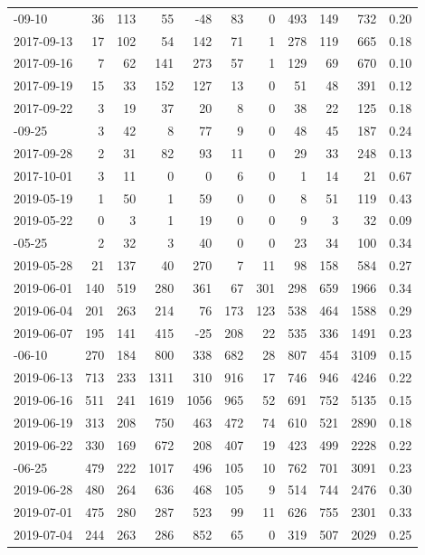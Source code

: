 \documentclass[
]{article}
\begin{document}
\begin{longtable}{lrrrrrrrrrr}
\addlinespace
2017-09-10 & 36 & 113 & 55 & -48 & 83 & 0 & 493 & 149 & 732 & 0.20\\
2017-09-13 & 17 & 102 & 54 & 142 & 71 & 1 & 278 & 119 & 665 & 0.18\\
2017-09-16 & 7 & 62 & 141 & 273 & 57 & 1 & 129 & 69 & 670 & 0.10\\
2017-09-19 & 15 & 33 & 152 & 127 & 13 & 0 & 51 & 48 & 391 & 0.12\\
2017-09-22 & 3 & 19 & 37 & 20 & 8 & 0 & 38 & 22 & 125 & 0.18\\
\addlinespace
2017-09-25 & 3 & 42 & 8 & 77 & 9 & 0 & 48 & 45 & 187 & 0.24\\
2017-09-28 & 2 & 31 & 82 & 93 & 11 & 0 & 29 & 33 & 248 & 0.13\\
2017-10-01 & 3 & 11 & 0 & 0 & 6 & 0 & 1 & 14 & 21 & 0.67\\
2019-05-19 & 1 & 50 & 1 & 59 & 0 & 0 & 8 & 51 & 119 & 0.43\\
2019-05-22 & 0 & 3 & 1 & 19 & 0 & 0 & 9 & 3 & 32 & 0.09\\
\addlinespace
2019-05-25 & 2 & 32 & 3 & 40 & 0 & 0 & 23 & 34 & 100 & 0.34\\
2019-05-28 & 21 & 137 & 40 & 270 & 7 & 11 & 98 & 158 & 584 & 0.27\\
2019-06-01 & 140 & 519 & 280 & 361 & 67 & 301 & 298 & 659 & 1966 & 0.34\\
2019-06-04 & 201 & 263 & 214 & 76 & 173 & 123 & 538 & 464 & 1588 & 0.29\\
2019-06-07 & 195 & 141 & 415 & -25 & 208 & 22 & 535 & 336 & 1491 & 0.23\\
\addlinespace
2019-06-10 & 270 & 184 & 800 & 338 & 682 & 28 & 807 & 454 & 3109 & 0.15\\
2019-06-13 & 713 & 233 & 1311 & 310 & 916 & 17 & 746 & 946 & 4246 & 0.22\\
2019-06-16 & 511 & 241 & 1619 & 1056 & 965 & 52 & 691 & 752 & 5135 & 0.15\\
2019-06-19 & 313 & 208 & 750 & 463 & 472 & 74 & 610 & 521 & 2890 & 0.18\\
2019-06-22 & 330 & 169 & 672 & 208 & 407 & 19 & 423 & 499 & 2228 & 0.22\\
\addlinespace
2019-06-25 & 479 & 222 & 1017 & 496 & 105 & 10 & 762 & 701 & 3091 & 0.23\\
2019-06-28 & 480 & 264 & 636 & 468 & 105 & 9 & 514 & 744 & 2476 & 0.30\\
2019-07-01 & 475 & 280 & 287 & 523 & 99 & 11 & 626 & 755 & 2301 & 0.33\\
2019-07-04 & 244 & 263 & 286 & 852 & 65 & 0 & 319 & 507 & 2029 & 0.25\\

\end{longtable}
\end{document}

